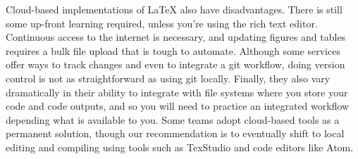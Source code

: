 \documentclass[
]{book}
\begin{document}
Cloud-based implementations of LaTeX also have disadvantages.
There is still some up-front learning required, unless you're using the rich text editor.
Continuous access to the internet is necessary,
and updating figures and tables requires a bulk file upload that is tough to automate.
Although some services offer ways to track changes and even to integrate a git workflow,
doing version control is not as straightforward as using git locally.
Finally, they also vary dramatically in their ability to integrate
with file systems where you store your code and code outputs,
and so you will need to practice an integrated workflow depending what is available to you.
Some teams adopt cloud-based tools as a permanent solution,
though our recommendation is to eventually shift to
local editing and compiling using tools such as TexStudio and code editors like Atom.
\end{document}
